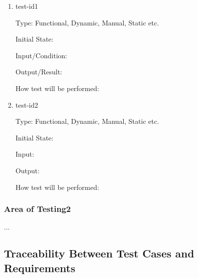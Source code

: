 \documentclass[12pt, titlepage]{article}
\begin{document}
\begin{enumerate}

  \item{test-id1\\}

    Type: Functional, Dynamic, Manual, Static etc.

    Initial State:

    Input/Condition:

    Output/Result:

    How test will be performed:

  \item{test-id2\\}

    Type: Functional, Dynamic, Manual, Static etc.

    Initial State:

    Input:

    Output:

    How test will be performed:

\end{enumerate}

\subsubsection{Area of Testing2}

...

\subsection{Traceability Between Test Cases and Requirements}

\end{document}
